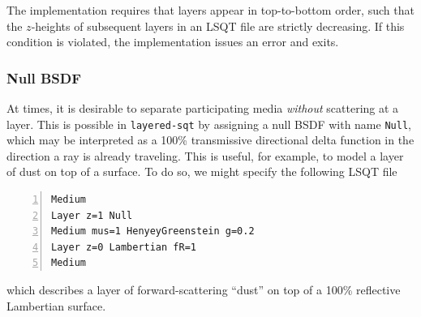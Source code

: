 \documentclass[
    twoside,
    twocolumn,
    letterpaper,
    10pt]{article}
\newcommand\namett[2]{{\color{code#1}\texttt{#2}}}
\begin{document}
The implementation requires that layers appear in top-to-bottom order,
such that the $z$-heights of subsequent layers in an LSQT file are
strictly decreasing. If this condition 
is violated, the implementation issues an error and exits.

\subsubsection{Null BSDF}
\label{sec:doc-layers-null}

At times, it is desirable to separate participating media 
\emph{without} scattering at a layer. This is possible in
\texttt{layered-sqt} by assigning a null BSDF with name 
\namett{purple}{Null}, which may be interpreted as a 100\% 
transmissive directional delta function in the direction a 
ray is already traveling. This is useful, for example, to model a 
layer of dust on top of a surface. To do so, we might specify the 
following LSQT file
\begin{lstlisting}[numbers=left]
Medium
Layer z=1 Null
Medium mus=1 HenyeyGreenstein g=0.2
Layer z=0 Lambertian fR=1
Medium
\end{lstlisting}
which describes a layer of forward-scattering ``dust'' on top 
of a 100\% reflective Lambertian surface.
\end{document}
